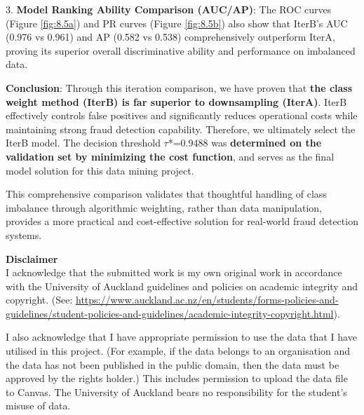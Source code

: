 \documentclass[sigplan,screen]{acmart}
\begin{document}
3. \textbf{Model Ranking Ability Comparison (AUC/AP)}: The ROC curves (Figure \ref{fig:8.5a}) and PR curves (Figure \ref{fig:8.5b}) also show that IterB's AUC (0.976 vs 0.961) and AP (0.582 vs 0.538) comprehensively outperform IterA, proving its superior overall discriminative ability and performance on imbalanced data.

\textbf{Conclusion}: Through this iteration comparison, we have proven that \textbf{the class weight method (IterB) is far superior to downsampling (IterA)}. IterB effectively controls false positives and significantly reduces operational costs while maintaining strong fraud detection capability. Therefore, we ultimately select the IterB model. The decision threshold $\tau$*=0.9488 was \textbf{determined on the validation set by minimizing the cost function}, and serves as the final model solution for this data mining project.

This comprehensive comparison validates that thoughtful handling of class imbalance through algorithmic weighting, rather than data manipulation, provides a more practical and cost-effective solution for real-world fraud detection systems.




\bigskip
\noindent\textbf{Disclaimer}\\
\noindent I acknowledge that the submitted work is my own original work in accordance with the University of Auckland guidelines and policies on academic integrity and copyright. (See: \url{https://www.auckland.ac.nz/en/students/forms-policies-and-guidelines/student-policies-and-guidelines/academic-integrity-copyright.html}).

\noindent I also acknowledge that I have appropriate permission to use the data that I have utilised in this project. (For example, if the data belongs to an organisation and the data has not been published in the public domain, then the data must be approved by the rights holder.) This includes permission to upload the data file to Canvas. The University of Auckland bears no responsibility for the student's misuse of data.
\end{document}
